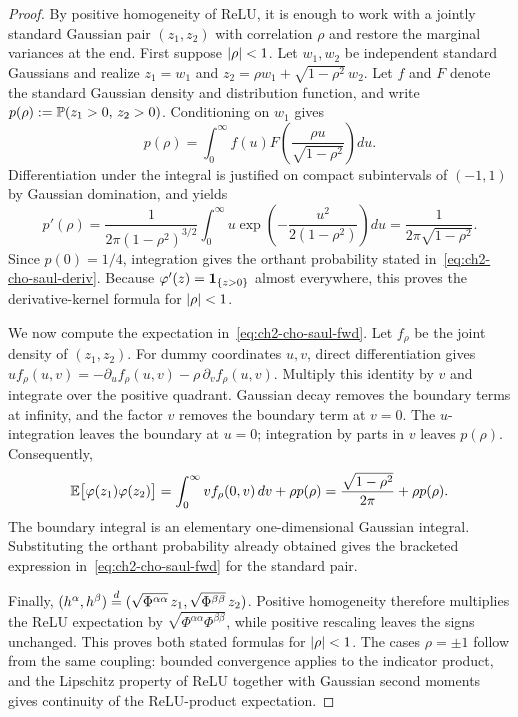 \begin{proof}
By positive homogeneity of ReLU, it is enough to work with a jointly standard Gaussian pair $(z_1, z_2)$ with correlation $\rho$ and restore the marginal variances at the end. First suppose $\left\lvert \rho \right\rvert < 1$. Let $w_1, w_2$ be independent standard Gaussians and realize $z_1 = w_1$ and $z_2 = \rho w_1 + \sqrt{1 - \rho^2}\, w_2$. Let $f$ and $F$ denote the standard Gaussian density and distribution function, and write $p(\rho) := \mathbb{P}(z_1 > 0,\, z_2 > 0)$. Conditioning on $w_1$ gives
\begin{equation}\label{eq:ch2-orthant-int}
p(\rho) = \int_0^\infty f(u) F\!\left(\frac{\rho u}{\sqrt{1 - \rho^2}}\right) du.
\end{equation}
Differentiation under the integral is justified on compact subintervals of $(-1, 1)$ by Gaussian domination, and yields
\begin{equation}\label{eq:ch2-orthant-deriv}
p'(\rho) = \frac{1}{2\pi(1 - \rho^2)^{3/2}} \int_0^\infty u \exp\!\left(-\frac{u^2}{2(1 - \rho^2)}\right) du = \frac{1}{2\pi\sqrt{1 - \rho^2}}.
\end{equation}
Since $p(0) = 1/4$, integration gives the orthant probability stated in~\eqref{eq:ch2-cho-saul-deriv}. Because $\varphi'(z) = \mathbf{1}_{\{z > 0\}}$ almost everywhere, this proves the derivative-kernel formula for $\left\lvert \rho \right\rvert < 1$.

We now compute the expectation in~\eqref{eq:ch2-cho-saul-fwd}. Let $f_\rho$ be the joint density of $(z_1, z_2)$. For dummy coordinates $u, v$, direct differentiation gives $u f_\rho(u, v) = -\partial_u f_\rho(u, v) - \rho\, \partial_v f_\rho(u, v)$. Multiply this identity by $v$ and integrate over the positive quadrant. Gaussian decay removes the boundary terms at infinity, and the factor $v$ removes the boundary term at $v = 0$. The $u$-integration leaves the boundary at $u = 0$; integration by parts in $v$ leaves $p(\rho)$. Consequently,
\begin{equation}\label{eq:ch2-relu-ibp}
\mathbb{E}\bigl[\varphi(z_1)\varphi(z_2)\bigr] = \int_0^\infty v f_\rho(0, v)\, dv + \rho p(\rho) = \frac{\sqrt{1 - \rho^2}}{2\pi} + \rho p(\rho).
\end{equation}
The boundary integral is an elementary one-dimensional Gaussian integral. Substituting the orthant probability already obtained gives the bracketed expression in~\eqref{eq:ch2-cho-saul-fwd} for the standard pair.

Finally, $(h^\alpha, h^\beta) \stackrel{d}{=} (\sqrt{\Phi^{\alpha\alpha}}\, z_1, \sqrt{\Phi^{\beta\beta}}\, z_2)$. Positive homogeneity therefore multiplies the ReLU expectation by $\sqrt{\Phi^{\alpha\alpha}\Phi^{\beta\beta}}$, while positive rescaling leaves the signs unchanged. This proves both stated formulas for $\left\lvert \rho \right\rvert < 1$. The cases $\rho = \pm 1$ follow from the same coupling: bounded convergence applies to the indicator product, and the Lipschitz property of ReLU together with Gaussian second moments gives continuity of the ReLU-product expectation.
\end{proof}

